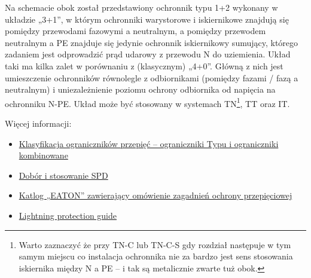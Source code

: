 Na schemacie obok został przedstawiony ochronnik typu 1+2 wykonany w układzie „3+1”, w którym ochronniki warystorowe i iskiernikowe znajdują się pomiędzy przewodami fazowymi a neutralnym, a pomiędzy przewodem neutralnym a PE znajduje się jedynie ochronnik iskiernikowy sumujący, którego zadaniem jest odprowadzić prąd udarowy z przewodu N do uziemienia.
Układ taki ma kilka zalet w porównaniu z (klasycznym) „4+0”.
Główną z nich jest umieszczenie ochronników równolegle z odbiornikami (pomiędzy fazami / fazą a neutralnym) i uniezależnienie poziomu ochrony odbiornika od napięcia na ochronniku N-PE.
Układ może być stosowany w systemach TN\footnote{Warto zaznaczyć że przy TN-C lub TN-C-S gdy rozdział następuje w tym samym miejscu co instalacja ochronnika nie za bardzo jest sens stosowania iskiernika między N a PE – i tak są metalicznie zwarte tuż obok.}, TT oraz IT.

\vspace{7pt}\noindent
Więcej informacji:
\begin{itemize}
	\item \href{https://rst.pl/ograniczniki-typu-i-ograniczniki-kombinowane-klasyfikacja-urzadzen/}{Klasyfikacja ograniczników przepięć – ograniczniki Typu i ograniczniki kombinowane}
	\item \href{https://www.dehn.pl/sites/default/files/uploads/dehn/DEHN-PL/druki/wp350_poradnik_dla_producentow_rozdzielnic.pdf}{Dobór i stosowanie SPD}
	\item \href{https://www.moeller.pl/Documentation/Katalogi/Katalog_EATON_opp_2010_PL.pdf}{Katlog „EATON” zawierający omówienie zagadnień ochrony przepięciowej}
	\item \href{https://www.dehn.pl/sites/default/files/uploads/dehn/pdf/blitzplaner/bpl2015/lpg_2015_e_complete.pdf}{Lightning protection guide}
\end{itemize}

